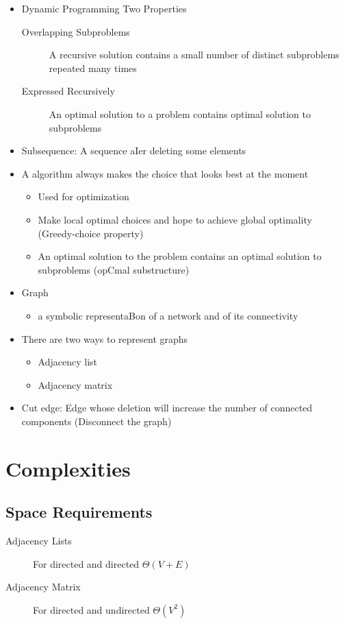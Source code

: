 \documentclass{article}
\begin{document}
\begin{itemize}
    \item Dynamic Programming Two Properties
    \begin{description}
        \item [Overlapping Subproblems] A recursive solution contains a small number of distinct subproblems repeated many times
        \item [Expressed Recursively] An optimal solution to a problem contains optimal solution to subproblems
    \end{description}
    \item Subsequence: A sequence aIer deleting some elements
    \item A algorithm always makes the choice that looks best at the moment
    \begin{itemize}
        \item Used for optimization
        \item Make local optimal choices and hope to achieve global optimality (Greedy-choice property)
        \item An optimal solution to the problem contains an optimal solution to subproblems (opCmal substructure)
    \end{itemize}
    \item Graph
    \begin{itemize}
        \item a symbolic representaBon of a network and of its connectivity
    \end{itemize}
    \item There are two ways to represent graphs
    \begin{itemize}
        \item Adjacency list
        \item Adjacency matrix
    \end{itemize}
    \item Cut edge: Edge whose deletion will increase the number of connected components (Disconnect the graph)
\end{itemize}

\section{Complexities}
\subsection{Space Requirements}
\begin{description}
    \item [Adjacency Lists] For directed and directed $\Theta(V + E)$
    \item [Adjacency Matrix] For directed and undirected $\Theta(V^2)$
\end{description}
\end{document}
